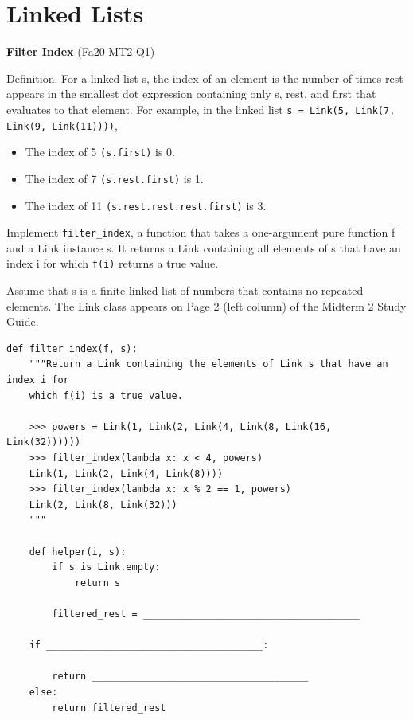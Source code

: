 \documentclass{exam}
\newlength{\currentparskip}
\newenvironment{blocksection}
{
    \setlength{\currentparskip}{\parskip}%
    \begin{minipage}{\linewidth}
    \setlength{\parskip}{\currentparskip}%
}
{
    \end{minipage}
}
\begin{document}
\section{Linked Lists}
\begin{questions}

\begin{blocksection}
\question \textbf{Filter Index} (Fa20 MT2 Q1)

    Definition. For a linked list s, the index of an element is the number of times rest appears in the smallest
    dot expression containing only s, rest, and first that evaluates to that element. For example, in the
    linked list \lstinline{s = Link(5, Link(7, Link(9, Link(11))))},
    
    \begin{itemize}
        \item The index of 5 \lstinline{(s.first)} is 0.
        \item The index of 7 \lstinline{(s.rest.first)} is 1.
        \item The index of 11 \lstinline{(s.rest.rest.rest.first)} is 3.
    \end{itemize}
    
    Implement \lstinline{filter_index}, a function that takes a one-argument pure function f and a Link instance s. It
    returns a Link containing all elements of s that have an index i for which \lstinline{f(i)} returns a true value.
    
    Assume that s is a finite linked list of numbers that contains no repeated elements. The Link class appears
    on Page 2 (left column) of the Midterm 2 Study Guide.
\begin{lstlisting}
def filter_index(f, s):
    """Return a Link containing the elements of Link s that have an index i for
    which f(i) is a true value.
    
    >>> powers = Link(1, Link(2, Link(4, Link(8, Link(16, Link(32))))))
    >>> filter_index(lambda x: x < 4, powers)
    Link(1, Link(2, Link(4, Link(8))))
    >>> filter_index(lambda x: x % 2 == 1, powers)
    Link(2, Link(8, Link(32)))
    """
    
    def helper(i, s):
        if s is Link.empty:
            return s

        filtered_rest = ______________________________________

    if ______________________________________:

        return ______________________________________
    else:
        return filtered_rest


\end{lstlisting}
\end{blocksection}
\end{questions}
\end{document}
